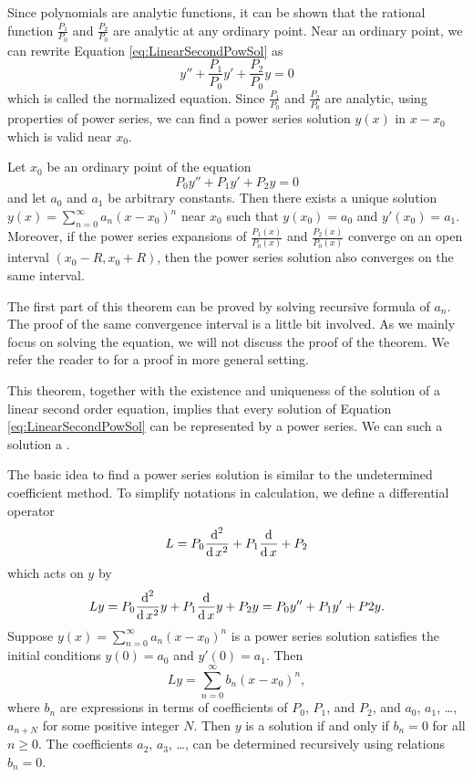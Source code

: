 Since polynomials are analytic functions, it can be shown that the rational function $\frac{P_1}{P_0}$ and $\frac{P_2}{P_0}$ are analytic at any ordinary point. Near an ordinary point, we can rewrite Equation \ref{eq:LinearSecondPowSol} as
\[y''+\frac{P_1}{P_0}y'+\frac{P_2}{P_0}y=0\]
which is called the normalized equation. Since $\frac{P_1}{P_0}$ and $\frac{P_2}{P_0}$ are analytic, using properties of power series, we can find a power series solution $y(x)$ in $x-x_0$ which is valid near $x_0$.

\begin{theorem}
  Let $x_0$ be an ordinary point of the equation
  \[P_0y''+P_1y'+P_2y=0\]
  and let $a_0$ and $a_1$ be arbitrary constants. Then there exists a unique solution $y(x)=\sum_{n=0}^\infty a_n(x-x_0)^n$ near $x_0$ such that $y(x_0)=a_0$ and $y'(x_0)=a_1$. Moreover, if the power series expansions of $\frac{P_1(x)}{P_0(x)}$ and $\frac{P_2(x)}{P_0(x)}$ converge on an open interval $(x_0-R, x_0+R)$, then the power series solution also converges on the same interval.
\end{theorem}

The first part of this theorem can be proved by solving recursive formula of $a_n$.  The proof of the same convergence interval is a little bit involved. As we mainly focus on solving the equation, we will not discuss the proof of the theorem. 
We refer the reader to \autocite[Section 28]{Simmons2016} for a proof in more general setting.

This theorem, together with the existence and uniqueness of the solution of a linear second order equation, implies that every solution of Equation \ref{eq:LinearSecondPowSol} can be represented by a power series. We can such a solution a .

The basic idea to find a power series solution is similar to the undetermined coefficient method. To simplify notations in calculation, we define a differential operator
\[L=P_0\dfrac{\operatorname{d}^2}{\operatorname{d} x^2}+P_1\dfrac{\operatorname{d}}{\operatorname{d} x}+P_2\]
which acts on $y$ by
\[Ly=P_0\dfrac{\operatorname{d}^2}{\operatorname{d} x^2}y+P_1\dfrac{\operatorname{d}}{\operatorname{d} x}y+P_2y=P_0y''+P_1y'+P2y.\]
Suppose $y(x)=\sum\limits_{n=0}^\infty a_n(x-x_0)^n$ is a power series solution satisfies the initial conditions $y(0)=a_0$ and $y'(0)=a_1$. Then
\[Ly=\sum\limits_{n=0}^\infty b_n(x-x_0)^n,\]
where $b_n$ are expressions in terms of coefficients of $P_0$, $P_1$, and $P_2$, and $a_0$, $a_1$, \dots, $a_{n+N}$ for some positive integer $N$. Then $y$ is a solution if and only if $b_n=0$ for all $n\ge 0$. The coefficients $a_2$, $a_3$, \dots, can be determined recursively using relations $b_n=0$.

